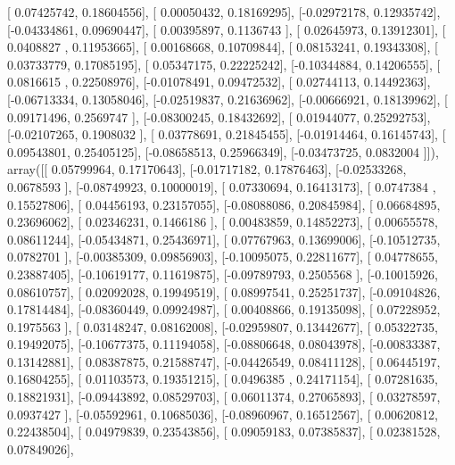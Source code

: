 \documentclass{article}
\begin{document}
       [ 0.07425742,  0.18604556],
       [ 0.00050432,  0.18169295],
       [-0.02972178,  0.12935742],
       [-0.04334861,  0.09690447],
       [ 0.00395897,  0.1136743 ],
       [ 0.02645973,  0.13912301],
       [ 0.0408827 ,  0.11953665],
       [ 0.00168668,  0.10709844],
       [ 0.08153241,  0.19343308],
       [ 0.03733779,  0.17085195],
       [ 0.05347175,  0.22225242],
       [-0.10344884,  0.14206555],
       [ 0.0816615 ,  0.22508976],
       [-0.01078491,  0.09472532],
       [ 0.02744113,  0.14492363],
       [-0.06713334,  0.13058046],
       [-0.02519837,  0.21636962],
       [-0.00666921,  0.18139962],
       [ 0.09171496,  0.2569747 ],
       [-0.08300245,  0.18432692],
       [ 0.01944077,  0.25292753],
       [-0.02107265,  0.1908032 ],
       [ 0.03778691,  0.21845455],
       [-0.01914464,  0.16145743],
       [ 0.09543801,  0.25405125],
       [-0.08658513,  0.25966349],
       [-0.03473725,  0.0832004 ]]), array([[ 0.05799964,  0.17170643],
       [-0.01717182,  0.17876463],
       [-0.02533268,  0.0678593 ],
       [-0.08749923,  0.10000019],
       [ 0.07330694,  0.16413173],
       [ 0.0747384 ,  0.15527806],
       [ 0.04456193,  0.23157055],
       [-0.08088086,  0.20845984],
       [ 0.06684895,  0.23696062],
       [ 0.02346231,  0.1466186 ],
       [ 0.00483859,  0.14852273],
       [ 0.00655578,  0.08611244],
       [-0.05434871,  0.25436971],
       [ 0.07767963,  0.13699006],
       [-0.10512735,  0.0782701 ],
       [-0.00385309,  0.09856903],
       [-0.10095075,  0.22811677],
       [ 0.04778655,  0.23887405],
       [-0.10619177,  0.11619875],
       [-0.09789793,  0.2505568 ],
       [-0.10015926,  0.08610757],
       [ 0.02092028,  0.19949519],
       [ 0.08997541,  0.25251737],
       [-0.09104826,  0.17814484],
       [-0.08360449,  0.09924987],
       [ 0.00408866,  0.19135098],
       [ 0.07228952,  0.1975563 ],
       [ 0.03148247,  0.08162008],
       [-0.02959807,  0.13442677],
       [ 0.05322735,  0.19492075],
       [-0.10677375,  0.11194058],
       [-0.08806648,  0.08043978],
       [-0.00833387,  0.13142881],
       [ 0.08387875,  0.21588747],
       [-0.04426549,  0.08411128],
       [ 0.06445197,  0.16804255],
       [ 0.01103573,  0.19351215],
       [ 0.0496385 ,  0.24171154],
       [ 0.07281635,  0.18821931],
       [-0.09443892,  0.08529703],
       [ 0.06011374,  0.27065893],
       [ 0.03278597,  0.0937427 ],
       [-0.05592961,  0.10685036],
       [-0.08960967,  0.16512567],
       [ 0.00620812,  0.22438504],
       [ 0.04979839,  0.23543856],
       [ 0.09059183,  0.07385837],
       [ 0.02381528,  0.07849026],
\end{document}
